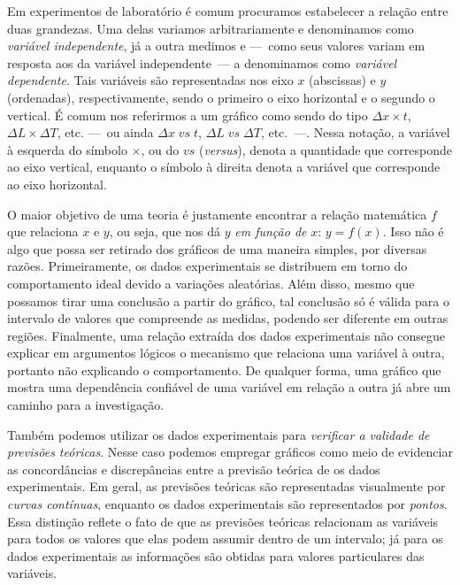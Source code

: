 Em experimentos de laboratório é comum procuramos estabelecer a relação entre duas grandezas. Uma delas variamos arbitrariamente e denominamos como \emph{variável independente}, já a outra medimos e ---~como seus valores variam em resposta aos da variável independente~--- a denominamos como \emph{variável dependente}. Tais variáveis são representadas nos eixo $x$  (abscissas) e $y$ (ordenadas), respectivamente, sendo o primeiro o eixo horizontal e o segundo o vertical. É comum nos referirmos a um gráfico como sendo do tipo $\Delta x \times t$, $\Delta L \times \Delta T$, etc. ---~ou ainda $\Delta x \;vs\; t$, $\Delta L \;vs\; \Delta T$, etc.~---. Nessa notação, a variável à esquerda do símbolo $\times$, ou do $vs$ (\emph{versus}), denota a quantidade que corresponde ao eixo vertical, enquanto o símbolo à direita denota a variável que corresponde ao eixo horizontal.

O maior objetivo de uma teoria é justamente encontrar a relação matemática $f$ que relaciona $x$ e $y$, ou seja, que nos dá $y$ \emph{em função de} $x$: $y = f(x)$. Isso não é algo que possa ser retirado dos gráficos de uma maneira simples, por diversas razões. Primeiramente, os dados experimentais se distribuem em torno do comportamento ideal devido a variações aleatórias. Além disso, mesmo que possamos tirar uma conclusão a partir do gráfico, tal conclusão só é válida para o intervalo de valores que compreende as medidas, podendo ser diferente em outras regiões. Finalmente, uma relação extraída dos dados experimentais não consegue explicar em argumentos lógicos o mecanismo que relaciona uma variável à outra, portanto não explicando o comportamento. De qualquer forma, uma gráfico que mostra uma dependência confiável de uma variável em relação a outra já abre um caminho para a investigação.

Também podemos utilizar os dados experimentais para \emph{verificar a validade de previsões teóricas}. Nesse caso podemos empregar gráficos como meio de evidenciar as concordâncias e discrepâncias entre a previsão teórica de os dados experimentais. Em geral, as previsões teóricas são representadas visualmente por \emph{curvas contínuas}, enquanto os dados experimentais são representados por \emph{pontos}. Essa distinção reflete o fato de que as previsões teóricas relacionam as variáveis para todos os valores que elas podem assumir dentro de um intervalo; já para os dados experimentais as informações são obtidas para valores particulares das variáveis.

